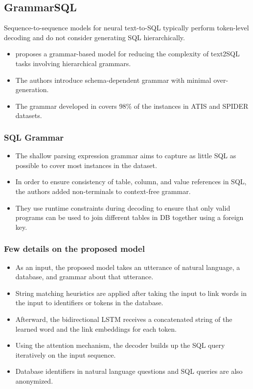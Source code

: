 \subsection{GrammarSQL}

Sequence-to-sequence models for neural text-to-SQL typically perform token-level decoding and do not consider generating SQL hierarchically.

\begin{itemize}
    \item \cite{xu_sqlnet_2017} proposes a grammar-based model for reducing the complexity of text2SQL tasks involving hierarchical grammars.
    \item The authors introduce schema-dependent grammar with minimal over-generation.
    \item The grammar developed in \cite{xu_sqlnet_2017} covers 98\% of the instances in ATIS and SPIDER datasets.
\end{itemize}

\subsubsection*{SQL Grammar}

\begin{itemize}
    \item The shallow parsing expression grammar aims to capture as little SQL as possible to cover most instances in the dataset.
    \item In order to ensure consistency of table, column, and value references in SQL, the authors added non-terminals to context-free grammar.
    \item They use runtime constraints during decoding to ensure that only valid programs can be used to join different tables in DB together using a foreign key.
\end{itemize}

\subsubsection*{Few details on the proposed model}

\begin{itemize}
    \item As an input, the proposed model takes an utterance of natural language, a database, and grammar about that utterance.
    \item String matching heuristics are applied after taking the input to link words in the input to identifiers or tokens in the database.
    \item Afterward, the bidirectional LSTM receives a concatenated string of the learned word and the link embeddings for each token.
    \item Using the attention mechanism, the decoder builds up the SQL query iteratively on the input sequence.
    \item Database identifiers in natural language questions and SQL queries are also anonymized.
\end{itemize}

